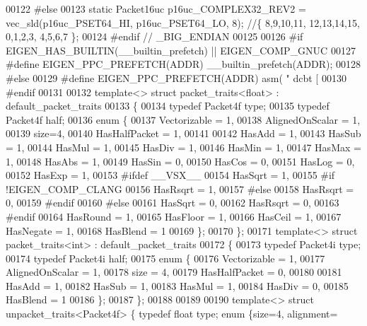 \begin{DoxyCode}
00122 \textcolor{preprocessor}{#else}
00123 \textcolor{keyword}{static} Packet16uc p16uc\_COMPLEX32\_REV2 = vec\_sld(p16uc\_PSET64\_HI, p16uc\_PSET64\_LO, 8);                     
                             \textcolor{comment}{//\{ 8,9,10,11, 12,13,14,15, 0,1,2,3, 4,5,6,7 \};}
00124 \textcolor{preprocessor}{#endif // \_BIG\_ENDIAN}
00125 
00126 \textcolor{preprocessor}{#if EIGEN\_HAS\_BUILTIN(\_\_builtin\_prefetch) || EIGEN\_COMP\_GNUC}
00127 \textcolor{preprocessor}{  #define EIGEN\_PPC\_PREFETCH(ADDR) \_\_builtin\_prefetch(ADDR);}
00128 \textcolor{preprocessor}{#else}
00129 \textcolor{preprocessor}{  #define EIGEN\_PPC\_PREFETCH(ADDR) asm( "   dcbt [%
00130 \textcolor{preprocessor}{#endif}
00131 
00132 \textcolor{keyword}{template}<> \textcolor{keyword}{struct }packet\_traits<float>  : default\_packet\_traits
00133 \{
00134   \textcolor{keyword}{typedef} Packet4f type;
00135   \textcolor{keyword}{typedef} Packet4f half;
00136   \textcolor{keyword}{enum} \{
00137     Vectorizable = 1,
00138     AlignedOnScalar = 1,
00139     size=4,
00140     HasHalfPacket = 1,
00141 
00142     HasAdd  = 1,
00143     HasSub  = 1,
00144     HasMul  = 1,
00145     HasDiv  = 1,
00146     HasMin  = 1,
00147     HasMax  = 1,
00148     HasAbs  = 1,
00149     HasSin  = 0,
00150     HasCos  = 0,
00151     HasLog  = 0,
00152     HasExp  = 1,
00153 \textcolor{preprocessor}{#ifdef \_\_VSX\_\_}
00154     HasSqrt = 1,
00155 \textcolor{preprocessor}{#if !EIGEN\_COMP\_CLANG}
00156     HasRsqrt = 1,
00157 \textcolor{preprocessor}{#else}
00158     HasRsqrt = 0,
00159 \textcolor{preprocessor}{#endif}
00160 \textcolor{preprocessor}{#else}
00161     HasSqrt = 0,
00162     HasRsqrt = 0,
00163 \textcolor{preprocessor}{#endif}
00164     HasRound = 1,
00165     HasFloor = 1,
00166     HasCeil = 1,
00167     HasNegate = 1,
00168     HasBlend = 1
00169   \};
00170 \};
00171 \textcolor{keyword}{template}<> \textcolor{keyword}{struct }packet\_traits<int>    : default\_packet\_traits
00172 \{
00173   \textcolor{keyword}{typedef} Packet4i type;
00174   \textcolor{keyword}{typedef} Packet4i half;
00175   \textcolor{keyword}{enum} \{
00176     Vectorizable = 1,
00177     AlignedOnScalar = 1,
00178     size = 4,
00179     HasHalfPacket = 0,
00180 
00181     HasAdd  = 1,
00182     HasSub  = 1,
00183     HasMul  = 1,
00184     HasDiv  = 0,
00185     HasBlend = 1
00186   \};
00187 \};
00188 
00189 
00190 \textcolor{keyword}{template}<> \textcolor{keyword}{struct }unpacket\_traits<Packet4f> \{ \textcolor{keyword}{typedef} \textcolor{keywordtype}{float}  type; \textcolor{keyword}{enum} \{size=4, alignment=
}
\end{DoxyCode}
